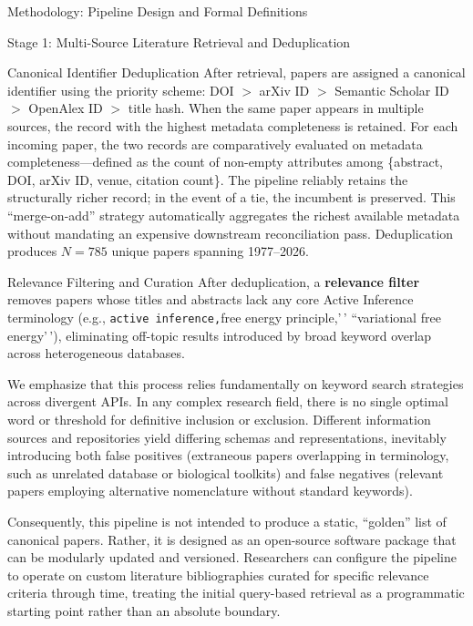 \documentclass[
  ignorenonframetext,
]{beamer}
\begin{document}
\begin{frame}[fragile]{Methodology: Pipeline Design and Formal
Definitions}
\begin{block}{Stage 1: Multi-Source Literature Retrieval and
Deduplication}
\begin{block}{Canonical Identifier Deduplication}
\protect{}\label{canonical-identifier-deduplication}
After retrieval, papers are assigned a canonical identifier using the
priority scheme: DOI \(>\) arXiv ID \(>\) Semantic Scholar ID \(>\)
OpenAlex ID \(>\) title hash. When the same paper appears in multiple
sources, the record with the highest metadata completeness is retained.
For each incoming paper, the two records are comparatively evaluated on
metadata completeness---defined as the count of non-empty attributes
among \{abstract, DOI, arXiv ID, venue, citation count\}. The pipeline
reliably retains the structurally richer record; in the event of a tie,
the incumbent is preserved. This ``merge-on-add'' strategy automatically
aggregates the richest available metadata without mandating an expensive
downstream reconciliation pass. Deduplication produces \(N = 785\)
unique papers spanning 1977--2026.
\end{block}

\begin{block}{Relevance Filtering and Curation}
\protect{}\label{relevance-filtering-and-curation}
After deduplication, a \textbf{relevance filter} removes papers whose
titles and abstracts lack any core Active Inference terminology (e.g.,
\texttt{active\ inference,\textquotesingle{}\textquotesingle{}}free
energy principle,'\,' ``variational free energy'\,'), eliminating
off-topic results introduced by broad keyword overlap across
heterogeneous databases.

We emphasize that this process relies fundamentally on keyword search
strategies across divergent APIs. In any complex research field, there
is no single optimal word or threshold for definitive inclusion or
exclusion. Different information sources and repositories yield
differing schemas and representations, inevitably introducing both false
positives (extraneous papers overlapping in terminology, such as
unrelated database or biological toolkits) and false negatives (relevant
papers employing alternative nomenclature without standard keywords).

Consequently, this pipeline is not intended to produce a static,
``golden'' list of canonical papers. Rather, it is designed as an
open-source software package that can be modularly updated and
versioned. Researchers can configure the pipeline to operate on custom
literature bibliographies curated for specific relevance criteria
through time, treating the initial query-based retrieval as a
programmatic starting point rather than an absolute boundary.
\end{block}
\end{block}


\end{frame}
\end{document}

